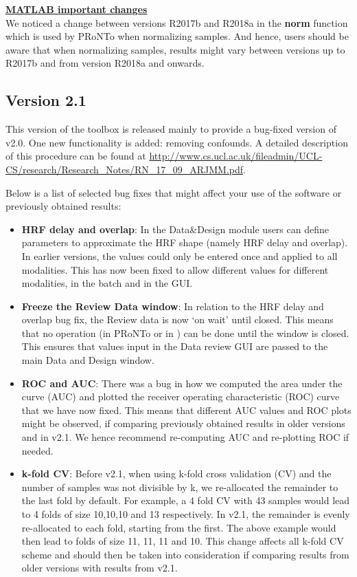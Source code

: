 \noindent \underline{\textbf{MATLAB important changes}}
\\

We noticed a change between \matlab{} versions R2017b and R2018a in the \matlab{} \textbf{norm} function which is used by PRoNTo when normalizing samples. And hence, users should be aware that when normalizing samples, results might vary between \matlab{} versions up to R2017b and from version R2018a and onwards.


\subsection{Version 2.1}
This version of the toolbox is released mainly to provide a bug-fixed version of v2.0. One new functionality is added: removing confounds. A detailed description of this procedure can be found at \url{http://www.cs.ucl.ac.uk/fileadmin/UCL-CS/research/Research_Notes/RN_17_09_ARJMM.pdf}. 

Below is a list of selected bug fixes that might affect your use of the software or previously obtained results: 
\begin{itemize}
\item \textbf{HRF delay and overlap}: In the Data\&Design module users can define parameters to approximate the HRF shape (namely HRF delay and overlap). In earlier versions, the values could only be entered once and applied to all modalities. This has now been fixed to allow different values for different modalities, in the batch and in the GUI.   
\item \textbf{Freeze the Review Data window}: In relation to the HRF delay and overlap bug fix, the Review data is now `on wait' until closed. This means that no operation (in PRoNTo or in \matlab) can be done until the window is closed. This ensures that values input in the Data review GUI are passed to the main Data and Design window.   
\item \textbf{ROC and AUC}: There was a bug in how we computed the area under the curve (AUC) and plotted the receiver operating characteristic (ROC) curve that we have now fixed. This means that different AUC values and ROC plots might be observed, if comparing previously obtained results in older versions and in v2.1. We hence recommend re-computing AUC and re-plotting ROC if needed. 
\item \textbf{k-fold CV}: Before v2.1, when using k-fold cross validation (CV) and the number of samples was not divisible by k, we re-allocated the remainder to the last fold by default. For example, a 4 fold CV with 43 samples would lead to 4 folds of size 10,10,10 and 13 respectively. In v2.1, the remainder is evenly re-allocated to each fold, starting from the first. The above example would then lead to folds of size 11, 11, 11 and 10. This change affects all k-fold CV scheme and should then be taken into consideration if comparing results from older versions with results from v2.1.  
 
\end{itemize}

